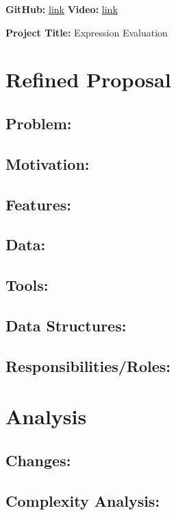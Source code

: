 \documentclass[11pt]{article}
\begin{document}
\textbf{GitHub:} \href{https://github.com/}{link} \hspace*{1.7cm} \textbf{Video:} \href{https://youtube.com/}{link}

\textbf{Project Title:} Expression Evaluation

\section*{Refined Proposal}

\subsection*{Problem:}

\subsection*{Motivation:}

\subsection*{Features:}

\subsection*{Data:}

\subsection*{Tools:}

\subsection*{Data Structures:}

\subsection*{Responsibilities/Roles:}

\section*{Analysis}

\subsection*{Changes:}

\subsection*{Complexity Analysis:}
\end{document}
